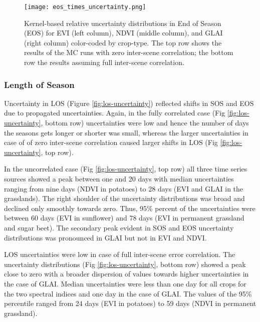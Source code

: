 \begin{figure*}
    \centering
    \texttt{[image: eos\_times\_uncertainty.png]}
    \caption{Kernel-based relative uncertainty distributions in End of Season (EOS) for \gls{EVI} (left column), \gls{NDVI} (middle column), and \gls{GLAI} (right column) color-coded by crop-type. The top row shows the results of the  \gls{MC} runs with zero inter-scene correlation; the bottom row the results assuming full inter-scene correlation.}
    \label{fig:eos-uncertainty}
\end{figure*}

\subsubsection{Length of Season}

Uncertainty in \gls{LOS} (Figure \ref{fig:los-uncertainty}) reflected shifts in \gls{SOS} and \gls{EOS} due to propagated uncertainties. Again, in the fully correlated case (Fig \ref{fig:los-uncertainty}, bottom row) uncertainties were low and hence the number of days the seasons gets longer or shorter was small, whereas the larger uncertainties in case of of zero inter-scene correlation caused larger shifts in \gls{LOS} (Fig \ref{fig:los-uncertainty}, top row).

In the uncorrelated case (Fig \ref{fig:los-uncertainty}, top row) all three time series sources showed a peak between one and 20 days with median uncertainties ranging from nine days (\gls{NDVI}  in potatoes) to 28 days (\gls{EVI}  and \gls{GLAI} in the grasslands). The right shoulder of the uncertainty distributions was broad and declined only smoothly towards zero. Thus, 95\% percent of the uncertainties were between 60 days (\gls{EVI}  in sunflower) and 78 days (\gls{EVI}  in permanent grassland and sugar beet). The secondary peak evident in \gls{SOS} and \gls{EOS} uncertainty distributions was pronounced in \gls{GLAI} but not in \gls{EVI} and NDVI.

LOS uncertainties were low in case of full inter-scene error correlation. The uncertainty distributions (Fig \ref{fig:los-uncertainty}, bottom row) showed a peak close to zero with a broader dispersion of values towards higher uncertainties in the case of GLAI. Median uncertainties were less than one day for all crops for the two spectral indices and one day in the case of GLAI. The values of the 95\% percentile ranged from 24 days (\gls{EVI}  in potatoes) to 59 days (\gls{NDVI}  in permanent grassland).


